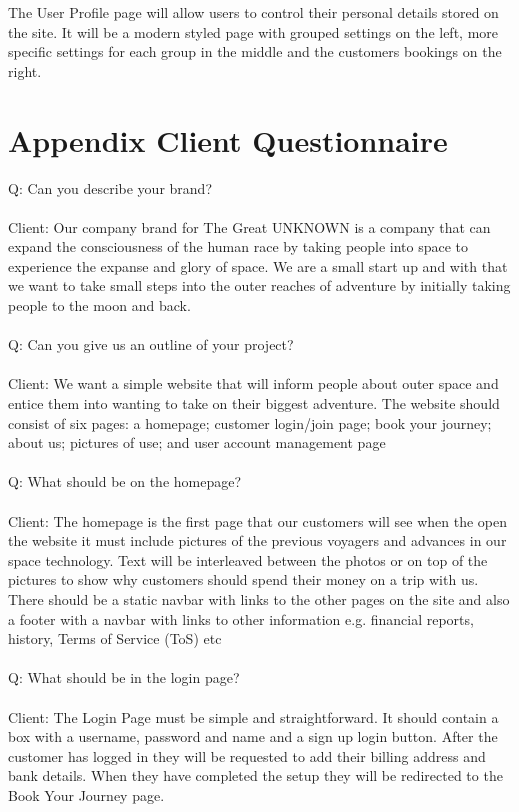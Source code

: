 \documentclass{article}
\begin{document}
The User Profile page will allow users to control their personal details stored on the site. It will be a modern styled page with grouped settings on the left, more specific settings for each group in the middle and the customers bookings on the right.
\pagebreak
\appendix

\section{Appendix Client Questionnaire}

Q: Can you describe your brand?
\\
\\
Client: Our company brand for The Great UNKNOWN is a company that can expand the consciousness of the human race by taking people into space to experience the expanse and glory of space. We are a small start up and with that we want to take small steps into the outer reaches of adventure by initially taking people to the moon and back. 
\\
\\
Q: Can you give us an outline of your project?
\\
\\
Client: We want a simple website that will inform people about outer space and entice them into wanting to take on their biggest adventure. 
The website should consist of six pages: a homepage; customer login/join page; book your journey; about us; pictures of use; and user account management page
\\
\\
Q: What should be on the homepage?
\\
\\
Client: The homepage is the first page that our customers will see when the open the website it must include pictures of the previous voyagers and advances in our space technology. Text will be interleaved between the photos or on top of the pictures to show why customers should spend their money on a trip with us. There should be a static navbar with links to the other pages on the site and also a footer with a navbar with links to other information e.g. financial reports, history, Terms of Service (ToS) etc
\\
\\
Q: What should be in the login page?
\\
\\
Client:  The Login Page must be simple and straightforward. It should contain a box with a username, password and name and a sign up login button. After the customer has logged in they will be requested to add their billing address and bank details. When they have completed the setup they will be redirected to the Book Your Journey page.
\end{document}
